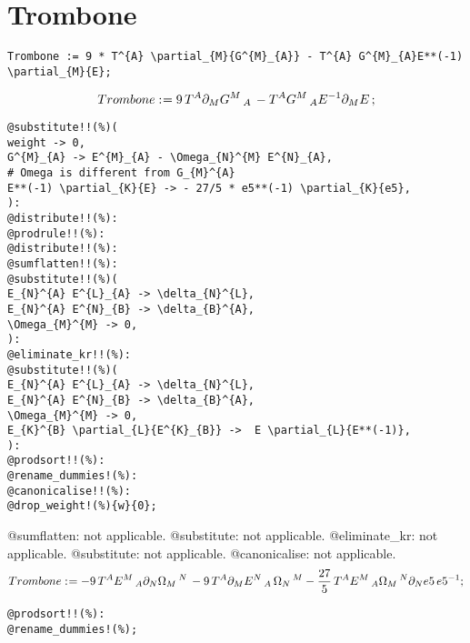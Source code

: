 \documentclass[11pt]{article}
\def\specialcolon{\mathrel{\mathop{:}}\hspace{-.5em}}
\begin{document}
\section*{Trombone}
{\color[named]{Blue}\begin{verbatim}
Trombone := 9 * T^{A} \partial_{M}{G^{M}_{A}} - T^{A} G^{M}_{A}E**(-1) \partial_{M}{E};
\end{verbatim}}
\begin{dmath*}[compact, spread=2pt]
Trombone\specialcolon{}= 9\, {T}^{A} {\partial}_{M}{{G}^{M}\,_{A}}\,  - {T}^{A} {G}^{M}\,_{A} E{}^{-1} {\partial}_{M}{E}\, ;
\end{dmath*}
{\color[named]{Blue}\begin{verbatim}
@substitute!!(%)(
weight -> 0,
G^{M}_{A} -> E^{M}_{A} - \Omega_{N}^{M} E^{N}_{A},
# Omega is different from G_{M}^{A}
E**(-1) \partial_{K}{E} -> - 27/5 * e5**(-1) \partial_{K}{e5},
):
@distribute!!(%):
@prodrule!!(%):
@distribute!!(%):
@sumflatten!!(%):
@substitute!!(%)(
E_{N}^{A} E^{L}_{A} -> \delta_{N}^{L},
E_{N}^{A} E^{N}_{B} -> \delta_{B}^{A},
\Omega_{M}^{M} -> 0,
):
@eliminate_kr!!(%):
@substitute!!(%)(
E_{N}^{A} E^{L}_{A} -> \delta_{N}^{L},
E_{N}^{A} E^{N}_{B} -> \delta_{B}^{A},
\Omega_{M}^{M} -> 0,
E_{K}^{B} \partial_{L}{E^{K}_{B}} ->  E \partial_{L}{E**(-1)},
):
@prodsort!!(%):
@rename_dummies!(%):
@canonicalise!!(%):
@drop_weight!(%){w}{0};
\end{verbatim}}
@sumflatten: not applicable.
@substitute: not applicable.
@eliminate\_kr: not applicable.
@substitute: not applicable.
@canonicalise: not applicable.
\begin{dmath*}[compact, spread=2pt]
Trombone\specialcolon{}=  - 9\, {T}^{A} {E}^{M}\,_{A} {\partial}_{N}{{\Omega}_{M}\,^{N}}\,  - 9\, {T}^{A} {\partial}_{M}{{E}^{N}\,_{A}}\,  {\Omega}_{N}\,^{M} - \frac{27}{5}\, {T}^{A} {E}^{M}\,_{A} {\Omega}_{M}\,^{N} {\partial}_{N}{e5}\,  e5{}^{-1};
\end{dmath*}
{\color[named]{Blue}\begin{verbatim}
@prodsort!!(%):
@rename_dummies!(%);
\end{verbatim}}
\end{document}
